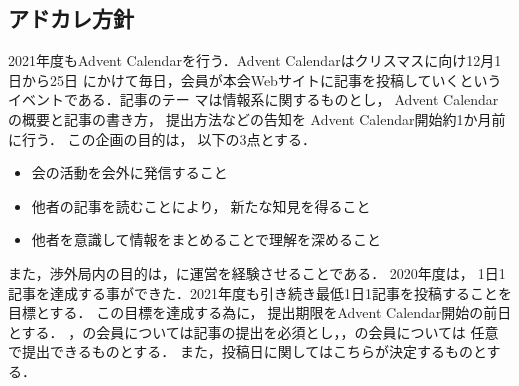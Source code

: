 \subsection*{アドカレ方針}


2021年度もAdvent Calendarを行う．Advent Calendarはクリスマスに向け12月1日から25日
にかけて毎日，会員が本会Webサイトに記事を投稿していくというイベントである．記事のテー
マは情報系に関するものとし，Advent Calendarの概要と記事の書き方，提出方法などの告知を
Advent Calendar開始約1か月前に行う．
この企画の目的は，以下の3点とする．
\begin{itemize}
    \item 会の活動を会外に発信すること
    \item 他者の記事を読むことにより，新たな知見を得ること
    \item 他者を意識して情報をまとめることで理解を深めること
\end{itemize}
また，渉外局内の目的は，\firstGrade{}に運営を経験させることである．
2020年度は，1日1記事を達成する事ができた．2021年度も引き続き最低1日1記事を投稿することを目標とする．
この目標を達成する為に，提出期限をAdvent Calendar開始の前日とする．
\firstGrade{}，\secondGrade{}の会員については記事の提出を必須とし，\thirdGrade{}，\fourthGrade{}の会員については
任意で提出できるものとする．
また，投稿日に関してはこちらが決定するものとする．
